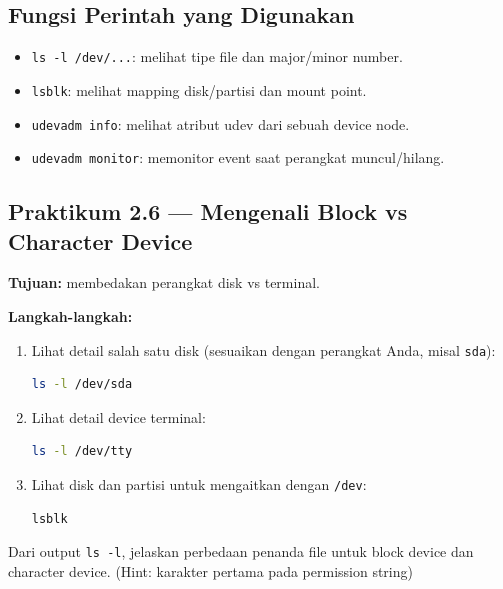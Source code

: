 \subsection*{Fungsi Perintah yang Digunakan}
\begin{itemize}
    \item \texttt{ls -l /dev/...}: melihat tipe file dan major/minor number.
    \item \texttt{lsblk}: melihat mapping disk/partisi dan mount point.
    \item \texttt{udevadm info}: melihat atribut udev dari sebuah device node.
    \item \texttt{udevadm monitor}: memonitor event saat perangkat muncul/hilang.
\end{itemize}

\subsection*{Praktikum 2.6 --- Mengenali Block vs Character Device}
\textbf{Tujuan:} membedakan perangkat disk vs terminal.

\textbf{Langkah-langkah:}
\begin{enumerate}
    \item Lihat detail salah satu disk (sesuaikan dengan perangkat Anda, misal \texttt{sda}):
\begin{lstlisting}[language=bash, caption={Melihat detail device node disk}]
ls -l /dev/sda
\end{lstlisting}

    \item Lihat detail device terminal:
\begin{lstlisting}[language=bash, caption={Melihat detail device node terminal}]
ls -l /dev/tty
\end{lstlisting}

    \item Lihat disk dan partisi untuk mengaitkan dengan \texttt{/dev}:
\begin{lstlisting}[language=bash, caption={Mapping disk/partisi}]
lsblk
\end{lstlisting}
\end{enumerate}

\begin{exercisebox}[2.3]
Dari output \texttt{ls -l}, jelaskan perbedaan penanda file untuk block device dan character device. (Hint: karakter pertama pada permission string)
\end{exercisebox}

